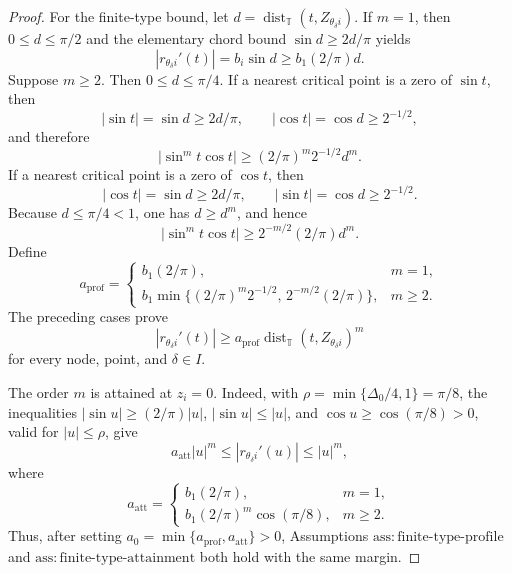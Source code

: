 \documentclass{article}
\begin{document}
\begin{proof}
For the finite-type bound, let \(d=\operatorname{dist}_{\mathbb T}(t,Z_{\theta_\delta i})\).  If \(m=1\), then \(0\leq d\leq\pi/2\) and the elementary chord bound \(\sin d\geq 2d/\pi\) yields
\[
 |r_{\theta_\delta i}'(t)|=b_i\sin d\geq b_1(2/\pi)d.
\]
Suppose \(m\geq2\).  Then \(0\leq d\leq\pi/4\).  If a nearest critical point is a zero of \(\sin t\), then
\[
 |\sin t|=\sin d\geq 2d/\pi,
 \qquad |\cos t|=\cos d\geq 2^{-1/2},
\]
and therefore
\[
 |\sin^m t\cos t|\geq (2/\pi)^m2^{-1/2}d^m.
\]
If a nearest critical point is a zero of \(\cos t\), then
\[
 |\cos t|=\sin d\geq 2d/\pi,
 \qquad |\sin t|=\cos d\geq2^{-1/2}.
\]
Because \(d\leq\pi/4<1\), one has \(d\geq d^m\), and hence
\[
 |\sin^m t\cos t|\geq 2^{-m/2}(2/\pi)d^m.
\]
Define
\[
 a_{\mathrm{prof}}=
 \begin{cases}
 b_1(2/\pi),&m=1,\\
 b_1\min\{(2/\pi)^m2^{-1/2},\,2^{-m/2}(2/\pi)\},&m\geq2.
 \end{cases}
\]
The preceding cases prove
\[
 |r_{\theta_\delta i}'(t)|\geq a_{\mathrm{prof}}
 \operatorname{dist}_{\mathbb T}(t,Z_{\theta_\delta i})^m
\]
for every node, point, and \(\delta\in I\).

The order \(m\) is attained at \(z_i=0\).  Indeed, with
\(\rho=\min\{\Delta_0/4,1\}=\pi/8\), the inequalities
\(|\sin u|\geq(2/\pi)|u|\), \(|\sin u|\leq |u|\), and
\(\cos u\geq\cos(\pi/8)>0\), valid for \(|u|\leq\rho\), give
\[
 a_{\mathrm{att}}|u|^m
 \leq |r_{\theta_\delta i}'(u)|
 \leq |u|^m,
\]
where
\[
 a_{\mathrm{att}}=
 \begin{cases}
 b_1(2/\pi),&m=1,\\
 b_1(2/\pi)^m\cos(\pi/8),&m\geq2.
 \end{cases}
\]
Thus, after setting \(a_0=\min\{a_{\mathrm{prof}},a_{\mathrm{att}}\}>0\), Assumptions \(\mathrm{ass:finite\text{-}type\text{-}profile}\) and \(\mathrm{ass:finite\text{-}type\text{-}attainment}\) both hold with the same margin.


\end{proof}
\end{document}
